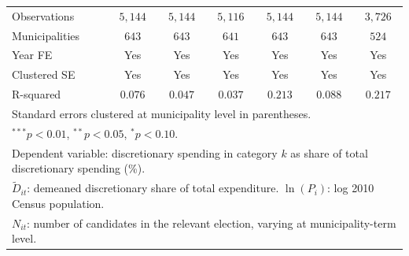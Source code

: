 \documentclass[12pt, a4paper]{article}
\begin{document}
\begin{table}[htbp]
{\begin{tabular}{lcccccc}
\hline
Observations & $5{,}144$ & $5{,}144$ & $5{,}116$ & $5{,}144$ & $5{,}144$ & $3{,}726$ \\
Municipalities & $643$ & $643$ & $641$ & $643$ & $643$ & $524$ \\
Year FE & Yes & Yes & Yes & Yes & Yes & Yes \\
Clustered SE & Yes & Yes & Yes & Yes & Yes & Yes \\
R-squared & $0.076$ & $0.047$ & $0.037$ & $0.213$ & $0.088$ & $0.217$ \\
\hline\hline
\multicolumn{7}{l}{\footnotesize Standard errors clustered at municipality level in parentheses.} \\
\multicolumn{7}{l}{\footnotesize $^{***}p<0.01$, $^{**}p<0.05$, $^{*}p<0.10$.} \\
\multicolumn{7}{l}{\footnotesize Dependent variable: discretionary spending in category $k$ as share of total discretionary spending (\%).} \\
\multicolumn{7}{l}{\footnotesize $\tilde{D}_{it}$: demeaned discretionary share of total expenditure. $\ln(P_i)$: log 2010 Census population.} \\
\multicolumn{7}{l}{\footnotesize $N_{it}$: number of candidates in the relevant election, varying at municipality-term level.} \\
\end{tabular}%
}
\end{table}
\end{document}
